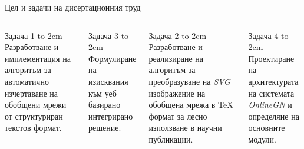 \documentclass[aspectratio=169]{beamer}
\begin{document}
\begin{frame}{Цел и задачи на дисертационния труд}
  \begin{columns}[T]
      \begin{block}{Задача 1}
        \vbox to 2cm{
          \vspace{0.1cm}
          \small Разработване и имплементация на алгоритъм за автоматично изчертаване на обобщени мрежи от структуриран текстов формат.
          \vfil
        }
      \end{block}

      \begin{block}{Задача 3}
        \vbox to 2cm{
          \vspace{0.1cm}
          \small Формулиране на изисквания към уеб базирано интегрирано решение.
          \vfil
        }
      \end{block}

          \begin{block}{Задача 2}
        \vbox to 2cm{
          \vspace{0.1cm}
          \small Разработване и реализиране на алгоритъм за преобразуване на \textit{SVG} изображение на обобщена мрежа в \TeX{} формат за лесно използване в научни публикации.
          \vfil
        }
      \end{block}

      \begin{block}{Задача 4}
        \vbox to 2cm{
          \vspace{0.1cm}
          \small Проектиране на архитектурата на системата \textit{OnlineGN} и определяне на основните модули.
          \vfil
        }
      \end{block}
    \end{columns}
\end{frame}
\end{document}
